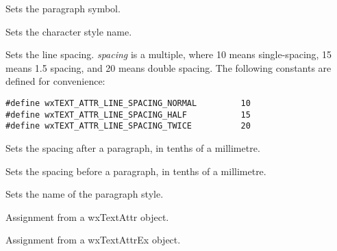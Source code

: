\label{wxtextattrexsetbulletsymbol}


Sets the paragraph symbol.

\label{wxtextattrexsetcharacterstylename}


Sets the character style name.

\label{wxtextattrexsetlinespacing}


Sets the line spacing. {\it spacing} is a multiple, where 10 means single-spacing,
15 means 1.5 spacing, and 20 means double spacing. The following constants are
defined for convenience:

{\small
\begin{verbatim}
#define wxTEXT_ATTR_LINE_SPACING_NORMAL         10
#define wxTEXT_ATTR_LINE_SPACING_HALF           15
#define wxTEXT_ATTR_LINE_SPACING_TWICE          20
\end{verbatim}
}

\label{wxtextattrexsetparagraphspacingafter}


Sets the spacing after a paragraph, in tenths of a millimetre.

\label{wxtextattrexsetparagraphspacingbefore}


Sets the spacing before a paragraph, in tenths of a millimetre.

\label{wxtextattrexsetparagraphstylename}


Sets the name of the paragraph style.

\label{wxtextattrexoperatorassign}


Assignment from a wxTextAttr object.


Assignment from a wxTextAttrEx object.
